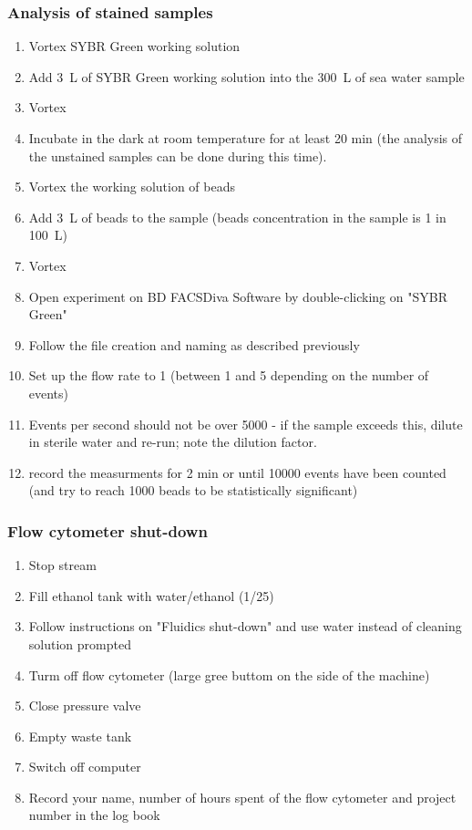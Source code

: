 \subsubsection{Analysis of stained samples}

\begin{enumerate}
\item Vortex SYBR Green working solution
\item Add 3~\textmu L of SYBR Green working solution into the 300~\textmu L of sea water sample
\item Vortex
\item Incubate in the dark at room temperature for at least 20 min (the analysis of the unstained samples can be done during this time).
\item Vortex the working solution of beads
\item Add 3~\textmu L of beads to the sample (beads concentration in the sample is 1 in 100~\textmu L)
\item Vortex 
\item Open experiment on BD FACSDiva Software by double-clicking on "SYBR Green"
\item Follow the file creation and naming as described previously
\item Set up the flow rate to 1 (between 1 and 5 depending on the number of events)
\item Events per second should not be over 5000 - if the sample exceeds this, dilute in sterile water and re-run; note the dilution factor.
\item record the measurments for 2 min or until 10000 events have been counted (and try to reach 1000 beads to be statistically significant)
\end{enumerate}

\subsubsection{Flow cytometer shut-down}

\begin{enumerate}
\item Stop stream
\item Fill ethanol tank with water/ethanol (1/25)
\item Follow instructions on "Fluidics shut-down" and use water instead of cleaning solution prompted
\item Turm off flow cytometer (large gree buttom on the side of the machine)
\item Close pressure valve
\item Empty waste tank
\item Switch off computer
\item Record your name, number of hours spent of the flow cytometer and project number in the log book
\end{enumerate}

